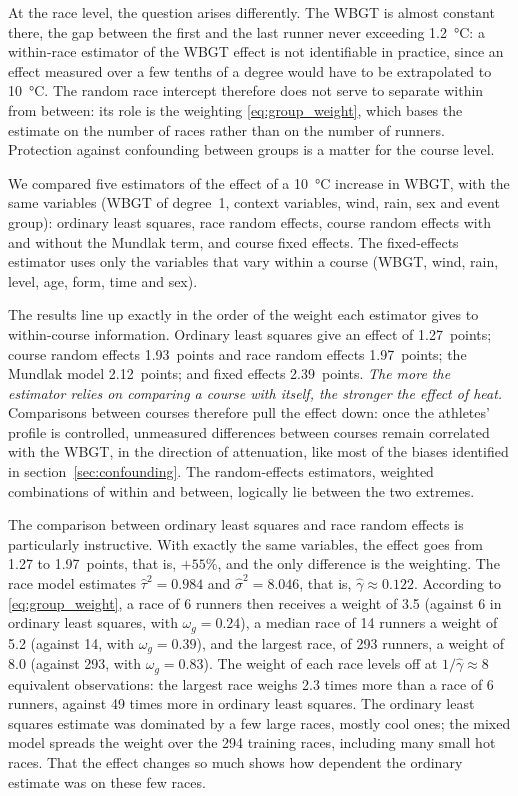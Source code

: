 \documentclass[11pt,a4paper]{article}
\begin{document}
At the race level, the question arises differently. The WBGT is almost constant there, the gap between the first and
the last runner never exceeding 1.2~°C: a within-race estimator of the WBGT effect is not identifiable in practice,
since an effect measured over a few tenths of a degree would have to be extrapolated to 10~°C. The random race
intercept therefore does not serve to separate within from between: its role is the weighting
\eqref{eq:group_weight}, which bases the estimate on the number of races rather than on the number of runners.
Protection against confounding between groups is a matter for the course level.

We compared five estimators of the effect of a 10~°C increase in WBGT, with the same variables (WBGT of degree~1,
context variables, wind, rain, sex and event group): ordinary least squares, race random effects, course random
effects with and without the Mundlak term, and course fixed effects. The fixed-effects estimator uses only the
variables that vary within a course (WBGT, wind, rain, level, age, form, time and sex).

The results line up exactly in the order of the weight each estimator gives to within-course information. Ordinary
least squares give an effect of 1.27~points; course random effects 1.93~points and race random effects 1.97~points;
the Mundlak model 2.12~points; and fixed effects 2.39~points. \emph{The more the estimator relies on comparing a course
with itself, the stronger the effect of heat.} Comparisons between courses therefore pull the effect down: once the
athletes' profile is controlled, unmeasured differences between courses remain correlated with the WBGT, in the
direction of attenuation, like most of the biases identified in section~\ref{sec:confounding}. The random-effects
estimators, weighted combinations of within and between, logically lie between the two extremes.

The comparison between ordinary least squares and race random effects is particularly instructive. With exactly the
same variables, the effect goes from 1.27 to 1.97~points, that is, $+55$\%, and the only difference is the weighting.
The race model estimates $\hat\tau^2 = 0.984$ and $\hat\sigma^2 = 8.046$, that is, $\hat\gamma \approx 0.122$.
According to \eqref{eq:group_weight}, a race of 6 runners then receives a weight of 3.5 (against 6 in ordinary least
squares, with $\omega_g = 0.24$), a median race of 14 runners a weight of 5.2 (against 14, with $\omega_g = 0.39$), and
the largest race, of 293 runners, a weight of 8.0 (against 293, with $\omega_g = 0.83$). The weight of each race levels
off at $1/\hat\gamma \approx 8$ equivalent observations: the largest race weighs 2.3 times more than a race of 6
runners, against 49 times more in ordinary least squares. The ordinary least squares estimate was dominated by a few
large races, mostly cool ones; the mixed model spreads the weight over the 294 training races, including many small
hot races. That the effect changes so much shows how dependent the ordinary estimate was on these few races.
\end{document}

